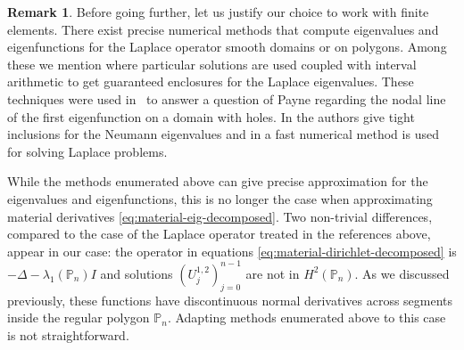 \documentclass[JEP,XML,SOM,Unicode,ThmDefs,NoFloatCountersInSection,published]{cedram}
\theoremstyle{plain}
\theoremstyle{definition}
\newtheorem{rem}[thm]{Remark}
\def\Pp{{\mathbb{P}_n}}
\begin{document}
\begin{rem}
Before going further, let us justify our choice to work with finite elements. There exist precise numerical methods that compute eigenvalues and eigenfunctions for the Laplace operator smooth domains or on polygons. Among these we mention \cite{dahne-salvy} where particular solutions are used coupled with interval arithmetic to get guaranteed enclosures for the Laplace eigenvalues. These techniques were used in~\cite{dahne-payne} to answer a question of Payne regarding the nodal line of the first eigenfunction on a domain with holes. In \cite{barnett-hassell} the authors give tight inclusions for the Neumann eigenvalues and in \cite{trefethen} a fast numerical method is used for solving Laplace problems.

While the methods enumerated above can give precise approximation for the eigenvalues and eigenfunctions, this is no longer the case when approximating material derivatives \eqref{eq:material-eig-decomposed}. Two non-trivial differences, compared to the case of the Laplace operator treated in the references above, appear in our case: the operator in equations \eqref{eq:material-dirichlet-decomposed} is $-\Delta -\lambda_1(\Pp)I$ and solutions $(U_j^{1,2})_{j=0}^{n-1}$ are not in $H^2(\Pp)$. As we discussed previously, these functions have discontinuous normal derivatives across segments inside the regular polygon $\Pp$. Adapting methods enumerated above to this case is not straightforward.
\end{rem}
\end{document}
